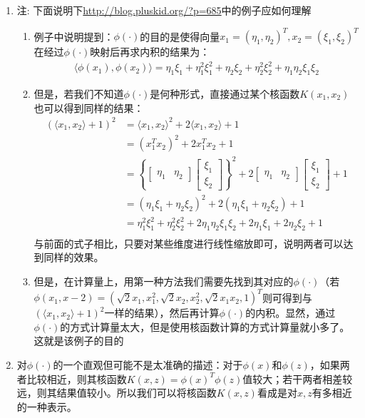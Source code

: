 \begin{enumerate}
	\item 注: 下面说明下\url{http://blog.pluskid.org/?p=685}中的例子应如何理解
	\begin{enumerate}
		\item 例子中说明提到：$\phi(\cdot)$的目的是使得向量$x_1=(\eta_1, \eta_2)^T, x_2=(\xi_1, \xi_2)^T$在经过$\phi(\cdot)$映射后再求内积的结果为：
		\begin{align}
			\langle \phi(x_1), \phi(x_2) \rangle = \eta_1\xi_1 + \eta_1^2\xi_1^2 + \eta_2\xi_2 + \eta_2^2\xi_2^2 + \eta_1\eta_2\xi_1\xi_2
		\end{align}
		\item 但是，若我们不知道$\phi(\cdot)$是何种形式，直接通过某个核函数$K(x_1, x_2)$也可以得到同样的结果：
		\begin{align}
			\left( \langle x_1, x_2 \rangle +1 \right)^2 &= \langle x_1, x_2 \rangle ^2 + 2 \langle x_1, x_2 \rangle + 1 \\
			&= (x_1^T x_2)^2 + 2x_1^T x_2 + 1 \\
			&=\left\{ \left[\begin{matrix}\eta_1 & \eta_2\end{matrix}\right]\left[\begin{matrix}\xi_1 \\ \xi_2\end{matrix}\right] \right\}^2 + 2\left[\begin{matrix}\eta_1 & \eta_2\end{matrix}\right]\left[\begin{matrix}\xi_1 \\ \xi_2\end{matrix}\right] + 1 \\
			&= (\eta_1\xi_1+\eta_2\xi_2)^2 + 2(\eta_1\xi_1+\eta_2\xi_2) + 1 \\
			&= \eta_1^2\xi_1^2 + \eta_2^2\xi_2^2 + 2\eta_1\eta_2\xi_1\xi_2 + 2\eta_1\xi_1 + 2\eta_2\xi_2 + 1 \\
		\end{align}
		与前面的式子相比，只要对某些维度进行线性缩放即可，说明两者可以达到同样的效果。
		\item 但是，在计算量上，用第一种方法我们需要先找到其对应的$\phi(\cdot)$（若$\phi(x_1, x-2)=(\sqrt{2}x_1, x_1^2, \sqrt{2}x_2, x_2^2, \sqrt{2}x_1x_2, 1)^T$则可得到与$\left( \langle x_1, x_2 \rangle +1 \right)^2$一样的结果），然后再计算$\phi(\cdot)$的内积。显然，通过$\phi(\cdot)$的方式计算量太大，但是使用核函数计算的方式计算量就小多了。这就是该例子的目的
	\end{enumerate}

	\item 对$\phi(\cdot)$的一个直观但可能不是太准确的描述：对于$\phi(x)$和$\phi(z)$，如果两者比较相近，则其核函数$K(x,z)=\phi(x)^T\phi(z)$值较大；若干两者相差较远，则其结果值较小。所以我们可以将核函数$K(x,z)$看成是对$x,z$有多相近的一种表示。
\end{enumerate}

